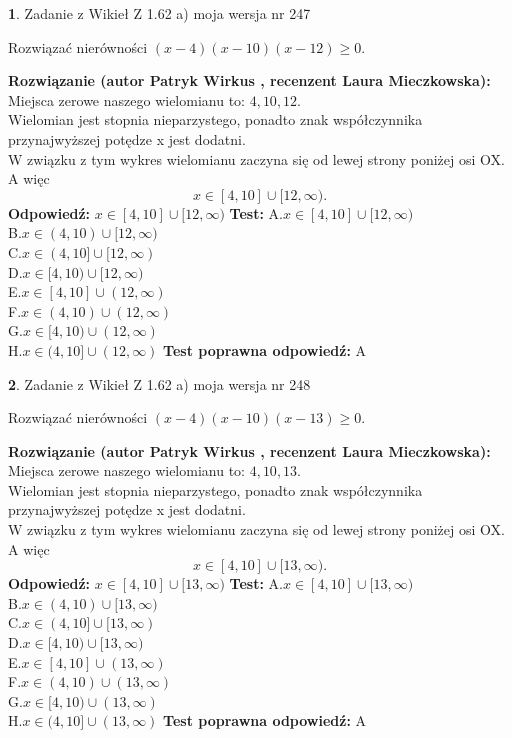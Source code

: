\documentclass[12pt, a4paper]{article}
\theoremstyle{definition} %
\newtheorem{zad}{}
\newcommand{\zadStart}[1]{\begin{zad}#1\newline}
\newcommand{\zadStop}{\end{zad}}
\newcommand{\rozwStart}[2]{\noindent \textbf{Rozwiązanie (autor #1 , recenzent #2): }\newline}
\newcommand{\rozwStop}{\newline}
\newcommand{\odpStart}{\noindent \textbf{Odpowiedź:}\newline}
\newcommand{\odpStop}{\newline}
\newcommand{\testStart}{\noindent \textbf{Test:}\newline}
\newcommand{\testStop}{\newline}
\newcommand{\kluczStart}{\noindent \textbf{Test poprawna odpowiedź:}\newline}
\newcommand{\kluczStop}{\newline}
\begin{document}
\zadStart{Zadanie z Wikieł Z 1.62 a) moja wersja nr 247}

Rozwiązać nierówności $(x-4)(x-10)(x-12)\ge0$.
\zadStop
\rozwStart{Patryk Wirkus}{Laura Mieczkowska}
Miejsca zerowe naszego wielomianu to: $4, 10, 12$.\\
Wielomian jest stopnia nieparzystego, ponadto znak współczynnika przy\linebreak najwyższej potędze x jest dodatni.\\ W związku z tym wykres wielomianu zaczyna się od lewej strony poniżej osi OX. A więc $$x \in [4,10] \cup [12,\infty).$$
\rozwStop
\odpStart
$x \in [4,10] \cup [12,\infty)$
\odpStop
\testStart
A.$x \in [4,10] \cup [12,\infty)$\\
B.$x \in (4,10) \cup [12,\infty)$\\
C.$x \in (4,10] \cup [12,\infty)$\\
D.$x \in [4,10) \cup [12,\infty)$\\
E.$x \in [4,10] \cup (12,\infty)$\\
F.$x \in (4,10) \cup (12,\infty)$\\
G.$x \in [4,10) \cup (12,\infty)$\\
H.$x \in (4,10] \cup (12,\infty)$
\testStop
\kluczStart
A
\kluczStop



\zadStart{Zadanie z Wikieł Z 1.62 a) moja wersja nr 248}

Rozwiązać nierówności $(x-4)(x-10)(x-13)\ge0$.
\zadStop
\rozwStart{Patryk Wirkus}{Laura Mieczkowska}
Miejsca zerowe naszego wielomianu to: $4, 10, 13$.\\
Wielomian jest stopnia nieparzystego, ponadto znak współczynnika przy\linebreak najwyższej potędze x jest dodatni.\\ W związku z tym wykres wielomianu zaczyna się od lewej strony poniżej osi OX. A więc $$x \in [4,10] \cup [13,\infty).$$
\rozwStop
\odpStart
$x \in [4,10] \cup [13,\infty)$
\odpStop
\testStart
A.$x \in [4,10] \cup [13,\infty)$\\
B.$x \in (4,10) \cup [13,\infty)$\\
C.$x \in (4,10] \cup [13,\infty)$\\
D.$x \in [4,10) \cup [13,\infty)$\\
E.$x \in [4,10] \cup (13,\infty)$\\
F.$x \in (4,10) \cup (13,\infty)$\\
G.$x \in [4,10) \cup (13,\infty)$\\
H.$x \in (4,10] \cup (13,\infty)$
\testStop
\kluczStart
A
\kluczStop
\end{document}
